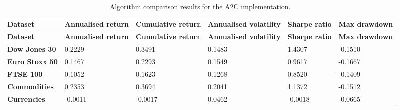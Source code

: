\begin{longtable}{|l|p{2.1cm}|p{2.1cm}|p{2.1cm}|p{1.5cm}|p{2cm}|}
    \caption{Algorithm comparison results for the A2C implementation.}
    \label{tab:experiment_algorithms_a2c}
    \\ 
    \hline
    \textbf{Dataset} & \textbf{Annualised return} & \textbf{Cumulative return} & \textbf{Annualised volatility} & \textbf{Sharpe ratio} & \textbf{Max drawdown}  \\ \midrule
    \endfirsthead

    \hline
    \textbf{Dataset} & \textbf{Annualised return} & \textbf{Cumulative return} & \textbf{Annualised volatility} & \textbf{Sharpe ratio} & \textbf{Max drawdown}  \\ \midrule
    \endhead

    \endfoot
    \hline

    \textbf{Dow Jones 30} & 0.2229 & 0.3491 & 0.1483 & 1.4307 & -0.1510 \\ \hline
    \textbf{Euro Stoxx 50} & 0.1467 & 0.2293 & 0.1549 & 0.9617 & -0.1667 \\ \hline
    \textbf{FTSE 100} & 0.1052 & 0.1623 & 0.1268 & 0.8520 & -0.1409 \\ \hline
    \textbf{Commodities} & 0.2353 & 0.3694 & 0.2041 & 1.1372 & -0.1512 \\ \hline
    \textbf{Currencies} & -0.0011 & -0.0017 & 0.0462 & -0.0018 & -0.0665 \\ \hline 
\end{longtable}
